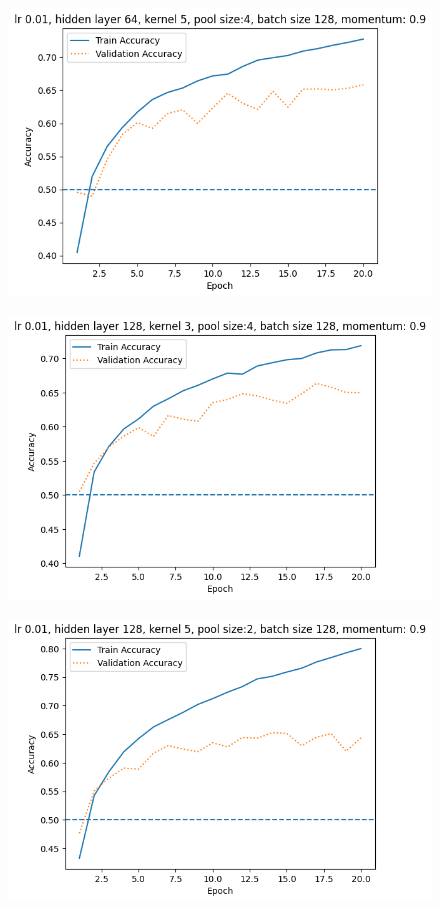 \begin{figure}[!ht]
    \centering\includegraphics[width=1\linewidth]{A5b-0.png}
\end{figure}
\begin{figure}[!ht]
    \centering\includegraphics[width=1\linewidth]{A5b-1.png}
\end{figure}
\begin{figure}[!ht]
    \centering\includegraphics[width=1\linewidth]{A5b-2.png}
\end{figure}